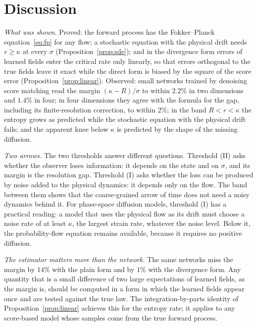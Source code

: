 \section{Discussion}
\label{sec:discussion}

\emph{What was shown.} Proved: the forward process has the Fokker--Planck equation~\eqref{eq:fp} for any flow; a stochastic equation with the physical drift needs $r \geq \kappa$ at every $\sigma$ (Proposition~\ref{prop:sde}); and in the divergence form errors of learned fields enter the critical rate only linearly, so that errors orthogonal to the true fields leave it exact while the direct form is biased by the square of the score error (Proposition~\ref{prop:linear}). Observed: small networks trained by denoising score matching read the margin $(\kappa - R)/\sigma$ to within $2.2\%$ in two dimensions and $1.4\%$ in four; in four dimensions they agree with the formula for the gap, including its finite-resolution correction, to within $2\%$; in the band $R < r < \kappa$ the entropy grows as predicted while the stochastic equation with the physical drift fails; and the apparent knee below $\kappa$ is predicted by the shape of the missing diffusion.

\emph{Two arrows.} The two thresholds answer different questions. Threshold (II) asks whether the observer loses information: it depends on the state and on $\sigma$, and its margin is the resolution gap. Threshold (I) asks whether the loss can be produced by noise added to the physical dynamics: it depends only on the flow. The band between them shows that the coarse-grained arrow of time does not need a noisy dynamics behind it. For phase-space diffusion models, threshold (I) has a practical reading: a model that uses the physical flow as its drift must choose a noise rate of at least $\kappa$, the largest strain rate, whatever the noise level. Below it, the probability-flow equation remains available, because it requires no positive diffusion.

\emph{The estimator matters more than the network.} The same networks miss the margin by $14\%$ with the plain form and by $1\%$ with the divergence form. Any quantity that is a small difference of two large expectations of learned fields, as the margin is, should be computed in a form in which the learned fields appear once and are tested against the true law. The integration-by-parts identity of Proposition~\ref{prop:linear} achieves this for the entropy rate; it applies to any score-based model whose samples come from the true forward process.

